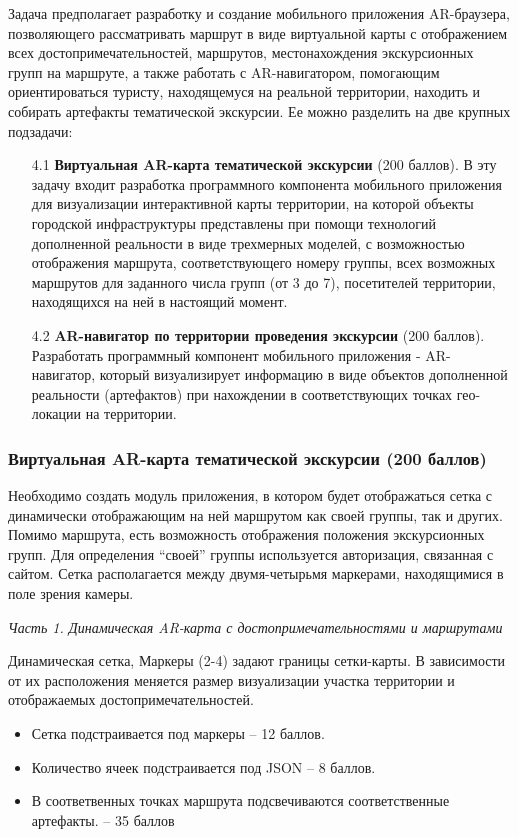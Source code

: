 
Задача предполагает разработку и создание мобильного приложения AR-браузера, позволяющего рассматривать маршрут в виде виртуальной карты с отображением всех достопримечательностей, маршрутов, местонахождения экскурсионных групп на маршруте, а также работать с AR-навигатором, помогающим ориентироваться туристу, находящемуся на реальной территории, находить и собирать артефакты тематической экскурсии. Ее можно разделить на две крупных подзадачи: 
\begin{enumerate}
    \item[4.1] \textbf{Виртуальная AR-карта тематической экскурсии} (200 баллов). В эту задачу входит разработка программного компонента мобильного приложения для визуализации интерактивной карты территории, на которой объекты городской инфраструктуры представлены при помощи технологий дополненной реальности в виде трехмерных моделей, с возможностью отображения маршрута, соответствующего номеру группы, всех возможных маршрутов для заданного числа групп (от 3 до 7), посетителей территории, находящихся на ней в настоящий момент.
    \item[4.2] \textbf{AR-навигатор по территории проведения экскурсии} (200 баллов). Разработать программный компонент мобильного приложения - AR-навигатор, который визуализирует информацию в виде объектов дополненной реальности (артефактов) при нахождении в соответствующих точках гео-локации на территории.
\end{enumerate}

\subsubsection*{Виртуальная AR-карта тематической экскурсии (200 баллов)}

Необходимо создать модуль приложения, в котором будет отображаться сетка с динамически отображающим на ней маршрутом как своей группы, так и других. Помимо маршрута, есть возможность отображения положения экскурсионных групп. Для определения “своей” группы используется авторизация, связанная с сайтом. Сетка располагается между двумя-четырьмя маркерами, находящимися в поле зрения камеры.

\textit{Часть 1. Динамическая AR-карта с достопримечательностями и маршрутами}

\markSection
Динамическая сетка, Маркеры (2-4) задают границы сетки-карты. В зависимости от их расположения  меняется размер визуализации участка территории и отображаемых достопримечательностей.
\begin{itemize}
    \item Сетка подстраивается под маркеры – 12 баллов. 
    \item Количество ячеек подстраивается под JSON – 8 баллов.
    \item В соответвенных точках маршрута подсвечиваются соответственные артефакты. – 35 баллов
\end{itemize}


